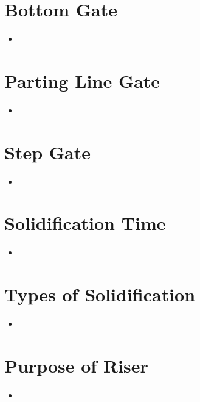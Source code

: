 \documentclass[8pt]{report}
\begin{document}
\section{Bottom Gate}
	\begin{itemize}
		\item
	\end{itemize}\hrulefill
\section{Parting Line Gate}
	\begin{itemize}
		\item
	\end{itemize}\hrulefill
\section{Step Gate}
	\begin{itemize}
		\item
	\end{itemize}\hrulefill
\section{Solidification Time}
	\begin{itemize}
		\item
	\end{itemize}\hrulefill
\section{Types of Solidification}
	\begin{itemize}
		\item
	\end{itemize}\hrulefill
\section{Purpose of Riser}
	\begin{itemize}
		\item
	\end{itemize}\hrulefill
\end{document}
